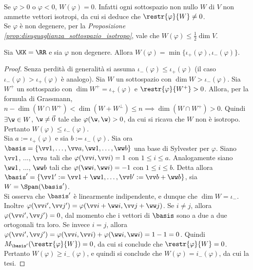 \begin{remark}\nl
	\li Se $\varphi > 0$ o $\varphi < 0$, $W(\varphi) = 0$. Infatti ogni sottospazio non nullo $W$ di $V$
	non ammette vettori isotropi, da cui si deduce che $\restr{\varphi}{W} \neq 0$. \\
	\li Se $\varphi$ è non degenere, per la \textit{Proposizione \ref{prop:disuguaglianza_sottospazio_isotropo}}, vale che $W(\varphi) \leq \frac{1}{2} \dim V$.
\end{remark}

\begin{proposition}
	Sia $\KK = \RR$ e sia $\varphi$ non degenere. Allora
	$W(\varphi) = \min\{\iota_+(\varphi), \iota_-(\varphi)\}$.
\end{proposition}

\begin{proof}
	Senza perdità di generalità si assuma $\iota_-(\varphi) \leq \iota_+(\varphi)$ (il caso $\iota_-(\varphi) > \iota_+(\varphi)$ è analogo). Sia $W$ un sottospazio con $\dim W > \iota_-(\varphi)$. Sia $W^+$
	un sottospazio con $\dim W^+ = \iota_+(\varphi)$ e $\restr{\varphi}{W^+} > 0$. Allora, per la formula
	di Grassmann, $n - \dim(W \cap W^+) < \dim (W + W^\perp) \leq n \implies \dim (W \cap W^+) > 0$. Quindi $\exists \w \in W$, $\w \neq \vec 0$ tale che $\varphi(\w, \w) > 0$, da cui
	si ricava che $W$ non è isotropo. Pertanto $W(\varphi) \leq \iota_-(\varphi)$. \\
	
	Sia $a := \iota_+(\varphi)$ e sia $b := \iota_-(\varphi)$.
	Sia ora $\basis = \{ \vv 1, \ldots, \vv a, \ww 1, \ldots, \ww b \}$ una base di Sylvester per $\varphi$. Siano $\vv 1$, ..., $\vv a$ tali che $\varphi(\vv i, \vv i) = 1$
	con $1 \leq i \leq a$. Analogamente siano $\ww 1$, ..., $\ww b$ tali che $\varphi(\ww i, \ww i) = -1$ con
	$1 \leq i \leq b$. Detta allora $\basis' = \{ \vv 1 ' := \vv 1 + \ww 1, \ldots, \vv b ' := \vv b + \ww b \}$, sia $W = \Span(\basis')$. \\
	
	Si osserva che $\basis'$ è linearmente indipendente, e dunque che $\dim W = \iota_-$. Inoltre
	$\varphi(\vv i ', \vv j ') = \varphi(\vv i + \ww i, \vv j + \ww j)$. Se $i \neq j$, allora
	$\varphi(\vv i ', \vv j ') = 0$, dal momento che i vettori di $\basis$ sono a due a due ortogonali
	tra loro. Se invece $i = j$, allora $\varphi(\vv i ', \vv j ') = \varphi(\vv i, \vv i) + \varphi(\ww i, \ww i) = 1-1=0$. Quindi $M_{\basis'}(\restr{\varphi}{W}) = 0$, da cui si conclude che $\restr{\varphi}{W} = 0$.
	Pertanto $W(\varphi) \geq i_-(\varphi)$, e quindi si conclude che $W(\varphi) = i_-(\varphi)$, da cui la tesi.
\end{proof}

